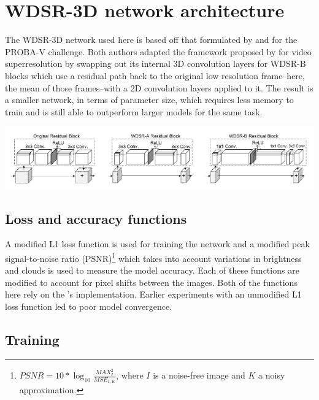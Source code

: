 \documentclass{article}
\begin{document}
\section{WDSR-3D network architecture}

The WDSR-3D network used here is based off that formulated by \citet{Dorr2020} and \citet{mark_bajo_2020_3733116} for the PROBA-V challenge. Both authors adapted the framework proposed by \citet{kim20183dsrnet} for video superresolution by swapping out its internal 3D convolution layers for WDSR-B blocks \citep{yu2018wide} which use a residual path back to the original low resolution frame--here, the mean of those frames--with a 2D convolution layers applied to it. The result is a smaller network, in terms of parameter size, which requires less memory to train and is still able to outperform larger models for the same task.


\begin{center}
    \includegraphics[width=\textwidth]{images/wdsr.png}
\end{center}



\subsection{Loss and accuracy functions}

A modified L1 loss function is used for training the network and a modified peak signal-to-noise ratio (PSNR)\footnote{$PSNR = 10 * \log_{10} \frac{MAX_{I}^2}{MSE_{I,K}}$, where $I$ is a noise-free image and $K$ a noisy approximation.} which takes into account variations in brightness and clouds is used to measure the model accuracy. Each of these functions are modified to account for pixel shifts between the images. Both of the functions here rely on the \citet{Dorr2020}'s implementation. Earlier experiments with an unmodified L1 loss function led to poor model convergence.

\subsection{Training}
\end{document}
